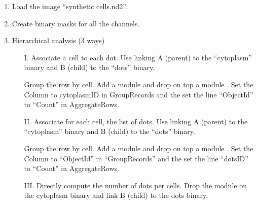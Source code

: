 \begin{enumerate}
    \item Load the image “synthetic cells.nd2”.
    \item Create binary masks for all the channels. 
    \item Hierarchical analysis (3 ways)
    \begin{enumerate}
        \item[I.] Associate a cell to each dot. Use  linking A (parent) to the “cytoplasm” binary and B (child) to the “dots” binary.
        
        \item[] Group the row by cell. Add a module  and drop on top a module . Set the Column to cytoplasmID in GroupRecords and the set the line “ObjectId” to “Count” in AggregateRows. 

        \item[II.] Associate for each cell, the list of dots. Use  linking A (parent) to the “cytoplasm” binary and B (child) to the “dots” binary.

        \item[] Group the row by cell. Add a module  and drop on top a module . Set the Column to “ObjectId” in “GroupRecords” and the set the line “dotsID” to “Count” in AggregateRows. 

        \item[III.] Directly compute the number of dots per cells. Drop the module  on the cytoplasm binary and link B (child) to the dots binary. 
 
    \end{enumerate}


\end{enumerate}
